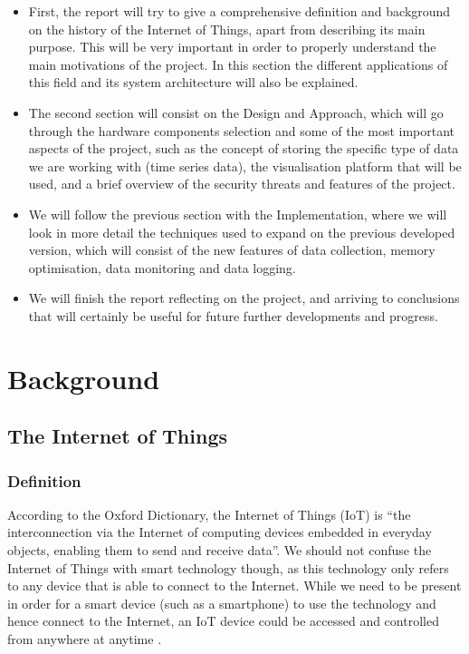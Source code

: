 \documentclass[12pt]{article}
\begin{document}
\begin{itemize}
    \item First, the report will try to give a comprehensive definition and background on the history of the Internet of Things, apart from describing its main purpose. This will be very important in order to properly understand the main motivations of the project. In this section the different applications of this field and its system architecture will also be explained. 
    \item The second section will consist on the Design and Approach, which will go through the hardware components selection and some of the most important aspects of the project, such as the concept of storing the specific type of data we are working with (time series data), the visualisation platform that will be used, and a brief overview of the security threats and features of the project.
    \item We will follow the previous section with the Implementation, where we will look in more detail the techniques used to expand on the previous developed version, which will consist of the new features of data collection, memory optimisation, data monitoring and data logging.
    \item We will finish the report reflecting on the project, and arriving to conclusions that will certainly be useful for future further developments and progress. 
\end{itemize}

\section{Background}
\subsection{The Internet of Things}

\subsubsection{Definition}

According to the Oxford Dictionary, the Internet of Things (IoT) is “the interconnection via the Internet of computing devices embedded in everyday objects, enabling them to send and receive data”.  We should not confuse the Internet of Things with smart technology though, as this technology only refers to any device that is able to connect to the Internet. While we need to be present in order for a smart device (such as a smartphone) to use the technology and hence connect to the Internet, an IoT device could be accessed and controlled from anywhere at anytime \cite{french2016digital}.\par
\end{document}

